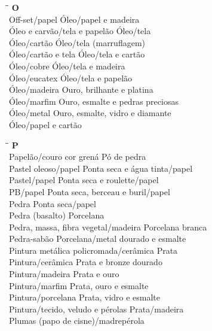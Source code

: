 \begin{tabbing}
	\hspace{8,7cm}\=\hspace{1cm}\=\kill
	\textbf{O} \>  \\ 
	Off-set/papel	\> Óleo/papel e madeira\\
	Óleo e carvão/tela e papelão \> Óleo/tela\\
	Óleo/cartão \> Óleo/tela (marruflagem) \\	
	Óleo/cartão e tela \> Óleo/tela e cartão\\
	Óleo/cobre	\> Óleo/tela e madeira\\
	Óleo/eucatex \> Óleo/tela e papelão\\
	Óleo/madeira \> Ouro, brilhante e platina \\	
	Óleo/marfim \> Ouro, esmalte e pedras preciosas\\
	Óleo/metal \> Ouro, esmalte, vidro e diamante \\	
	Óleo/papel e cartão \> \\
\end{tabbing}

\begin{tabbing}
	\hspace{8,7cm}\=\hspace{1cm}\=\kill
	\textbf{P} \>  \\ 
	Papelão/couro cor grená	\> Pó de pedra\\
	Pastel oleoso/papel \> Ponta seca e água tinta/papel\\
	Pastel/papel \> Ponta seca e roulette/papel \\	
	PB/papel \> Ponta seca, berceau e buril/papel\\
	Pedra	\> Ponta seca/papel\\
	Pedra (basalto)	\> Porcelana\\
	Pedra, massa, fibra vegetal/madeira \> Porcelana branca\\
	Pedra-sabão \> Porcelana/metal dourado e esmalte \\	
	Pintura metálica policromada/cerâmica \> Prata\\
	Pintura/cerâmica	\> Prata e bronze dourado\\
	Pintura/madeira \> Prata e ouro\\
	Pintura/marfim \> Prata, ouro e esmalte \\	
	Pintura/porcelana \> Prata, vidro e esmalte\\
	Pintura/tecido, veludo e pérolas \> Prata/madeira \\	
	Plumas (papo de cisne)/madrepérola \> \\
\end{tabbing}

